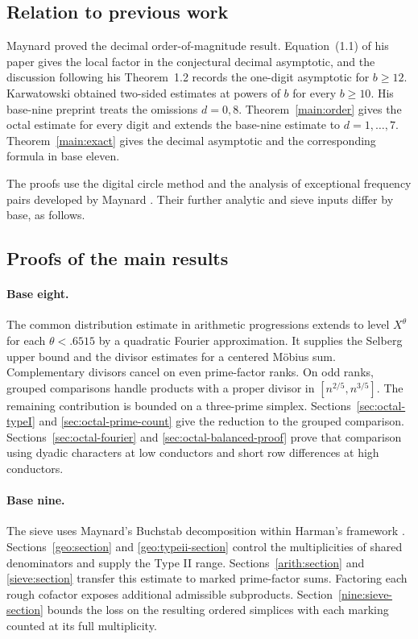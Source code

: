 \documentclass[11pt,a4paper]{article}
\theoremstyle{paperplain}
\numberwithin{equation}{section}
\begin{document}
\subsection{Relation to previous work}

Maynard \cite[Theorem~1.1]{Maynard2019} proved the decimal
order-of-magnitude result. Equation~(1.1) of his paper gives the
local factor in the conjectural decimal asymptotic, and the discussion
following his Theorem~1.2 records the one-digit asymptotic for
$b\geqslant12$. Karwatowski \cite[Theorem~1]{Karwatowski2022} obtained
two-sided estimates at powers of $b$ for every $b\geqslant10$.
His base-nine preprint \cite[Theorem~1]{KarwatowskiBaseNine} treats
the omissions $d=0,8$. Theorem~\ref{main:order} gives the octal
estimate for every digit and extends the base-nine estimate to
$d=1,\ldots,7$. Theorem~\ref{main:exact} gives the decimal asymptotic
and the corresponding formula in base eleven.

The proofs use the digital circle method and the analysis of
exceptional frequency pairs developed by Maynard
\cite[Sections~10 and~13--15]{Maynard2019}. Their further analytic and
sieve inputs differ by base, as follows.

\subsection{Proofs of the main results}\label{sec:outline}

\paragraph{Base eight.}
The common distribution estimate in arithmetic progressions extends
to level $X^\theta$ for each $\theta<.6515$ by a quadratic Fourier
approximation. It supplies the Selberg upper bound and the divisor
estimates for a centered M\"obius sum. Complementary divisors cancel on
even prime-factor ranks. On odd ranks, grouped comparisons handle
products with a proper divisor in $[n^{2/5},n^{3/5}]$.
The remaining contribution is bounded on a three-prime simplex.
Sections~\ref{sec:octal-typeI} and \ref{sec:octal-prime-count} give
the reduction to the grouped comparison. Sections~\ref{sec:octal-fourier}
and \ref{sec:octal-balanced-proof} prove that comparison using dyadic
characters at low conductors and short row differences at high conductors.

\paragraph{Base nine.}
The sieve uses Maynard's Buchstab decomposition
\cite[Section~6]{Maynard2019} within Harman's framework \cite{Harman2007}.
Sections~\ref{geo:section} and \ref{geo:typeii-section} control the
multiplicities of shared denominators and supply the Type II range.
Sections~\ref{arith:section} and \ref{sieve:section} transfer this
estimate to marked prime-factor sums. Factoring each rough cofactor
exposes additional admissible subproducts. Section~\ref{nine:sieve-section}
bounds the loss on the resulting ordered simplices with each marking
counted at its full multiplicity.
\end{document}
